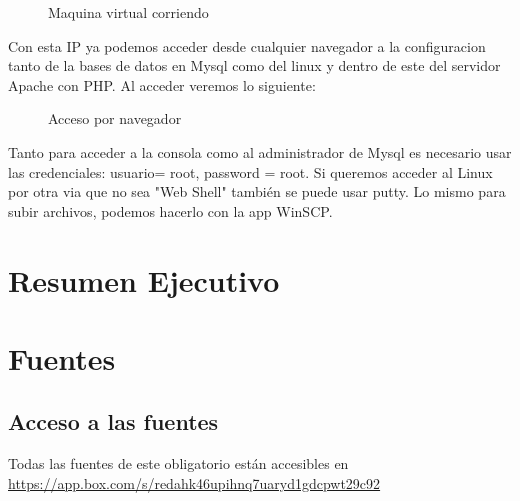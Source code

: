     \begin{figure} [H]
            \centering
            \caption{Maquina virtual corriendo}
    \end{figure}
    
    
    Con esta IP ya podemos acceder desde cualquier navegador a la configuracion tanto de la bases de datos en Mysql como del linux y dentro de este del servidor Apache con PHP.
    \clearpage
    Al acceder veremos lo siguiente:
    \begin{figure} [H]
            \centering
            \caption{Acceso por navegador}
    \end{figure}
    
    Tanto para acceder a la consola como al administrador de Mysql es necesario usar las credenciales: usuario= root, password = root.
    Si queremos acceder al Linux por otra via que no sea "Web Shell" también se puede usar putty. Lo mismo para subir archivos, podemos hacerlo con la app WinSCP.
\chapter{Resumen Ejecutivo}
    
\chapter{Fuentes}
    \section{Acceso a las fuentes}
    Todas las fuentes de este obligatorio están accesibles en
    \url{https://app.box.com/s/redahk46upihnq7uaryd1gdcpwt29c92}
